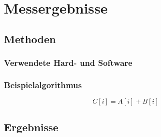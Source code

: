 \chapter{Messergebnisse}\label{messergebnisse}

\section{Methoden}\label{messergebnisse:methoden}

\subsection{Verwendete Hard- und Software}\label{messergebnisse:methoden:stack}

\subsection{Beispielalgorithmus}\label{messergebnisse:methoden:algorithmus}

\begin{equation}
    C[i] = A[i] + B[i]
\end{equation}

\section{Ergebnisse}\label{messergebnisse:ergebnisse}
